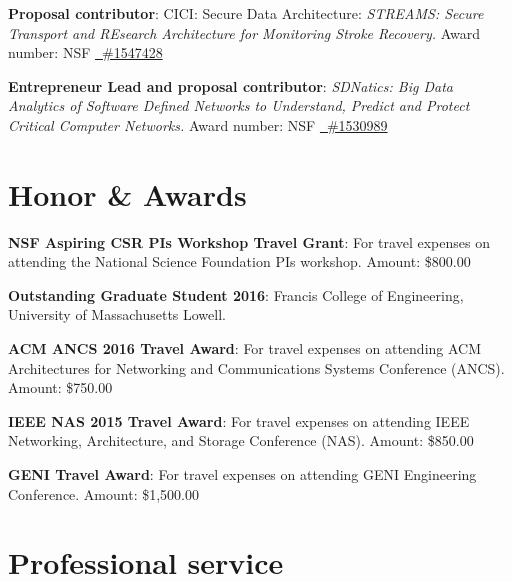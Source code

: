 \documentclass[11pt]{moderncv}
\begin{document}
%
{\textbf{Proposal contributor}: CICI: Secure Data Architecture: \textit{STREAMS: Secure Transport and REsearch Architecture for Monitoring Stroke Recovery.} \newline
Award number: NSF \href{https://www.nsf.gov/awardsearch/showAward?AWD_ID=1547428}
  {\color{color2}\homepagesymbol~\#1547428} 
}

%
{\textbf{Entrepreneur Lead and proposal contributor}: \textit{SDNatics: Big Data Analytics of Software Defined Networks to Understand, Predict and Protect Critical Computer Networks.} \newline
Award number: NSF \href{https://www.nsf.gov/awardsearch/showAward?AWD_ID=1530989}
    {\color{color2}\homepagesymbol~\#1530989} \newline
}

\section{Honor \& Awards}
%
{\textbf{NSF Aspiring CSR PIs Workshop Travel Grant}: For travel expenses on attending the National Science Foundation PIs workshop. \newline
Amount: \$800.00
}

%
{\textbf{Outstanding Graduate Student 2016}: Francis College of Engineering, University of Massachusetts Lowell.
}

%
{\textbf{ACM ANCS 2016 Travel Award}: For travel expenses on attending ACM Architectures for Networking and Communications Systems Conference (ANCS). \newline
Amount: \$750.00
}

%
{\textbf{IEEE NAS 2015 Travel Award}: For travel expenses on attending IEEE Networking, Architecture, and Storage Conference (NAS). \newline
Amount: \$850.00
}

%
{\textbf{GENI Travel Award}: For travel expenses on attending GENI Engineering Conference. \newline
Amount: \$1,500.00
}

\section{Professional service}
\end{document}
